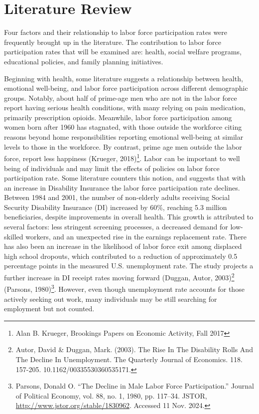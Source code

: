 \chapter{Literature Review}

Four factors and their relationship to labor force participation rates were frequently brought up in the literature. The contribution to labor force participation rates that will be examined are: health, social welfare programs, educational policies, and family planning initiatives.

Beginning with health, some literature suggests a relationship between health, emotional well-being, and labor force participation across different demographic groups. Notably, about half of prime-age men who are not in the labor force report having serious health conditions, with many relying on pain medication, primarily prescription opioids. Meanwhile, labor force participation among women born after 1960 has stagnated, with those outside the workforce citing reasons beyond home responsibilities reporting emotional well-being at similar levels to those in the workforce. By contrast, prime age men outside the labor force, report less happiness (Krueger, 2018)\footnote{Alan B. Krueger, Brookings Papers on Economic Activity, Fall 2017}. Labor can be important to well being of individuals and may limit the effects of policies on labor force participation rate. Some literature counters this notion, and suggests that with an increase in Disability Insurance the labor force participation rate declines. Between 1984 and 2001, the number of non-elderly adults receiving Social Security Disability Insurance (DI) increased by 60\%, reaching 5.3 million beneficiaries, despite improvements in overall health. This growth is attributed to several factors: less stringent screening processes, a decreased demand for low-skilled workers, and an unexpected rise in the earnings replacement rate. There has also been an increase in the likelihood of labor force exit among displaced high school dropouts, which contributed to a reduction of approximately 0.5 percentage points in the measured U.S. unemployment rate. The study projects a further increase in DI receipt rates moving forward (Duggan, Autor, 2003)\footnote{Autor, David \& Duggan, Mark. (2003). The Rise In The Disability Rolls And The Decline In Unemployment. The Quarterly Journal of Economics. 118. 157-205. 10.1162/00335530360535171.} (Parsons, 1980)\footnote{Parsons, Donald O. ``The Decline in Male Labor Force Participation.'' Journal of Political Economy, vol. 88, no. 1, 1980, pp. 117--34. JSTOR, \href{http://www.jstor.org/stable/1830962}{http://www.jstor.org/stable/1830962}. Accessed 11 Nov. 2024.}. However, even though unemployment rate accounts for those actively seeking out work, many individuals may be still searching for employment but not counted.

